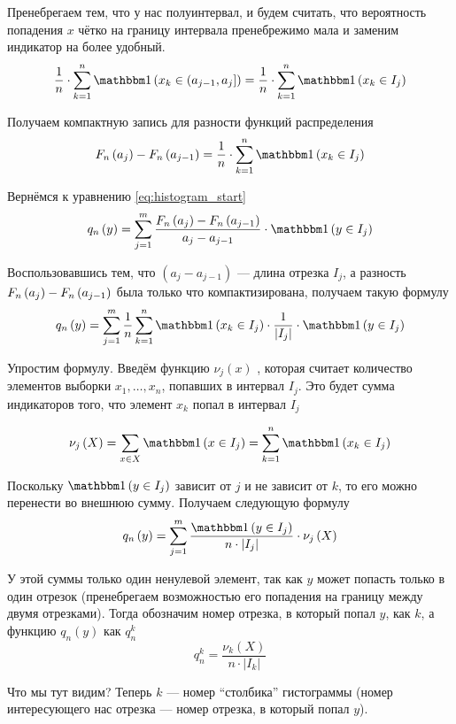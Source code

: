 Пренебрегаем тем, что у нас полуинтервал, и будем считать,
что вероятность попадения $x$ чётко на границу интервала пренебрежимо мала
и заменим индикатор на более удобный.
$$\frac{1}{n}\cdot \sum_{k=1}^n \indicator{x_k\in \left(a_{j-1},a_j\right]}
=\frac{1}{n}\cdot \sum_{k=1}^n \indicator{x_k\in I_j}$$

Получаем компактную запись для разности функций распределения
\begin{equation}\label{eq:cdfn_difference_final}
\cdfn{a_j}-\cdfn{a_{j-1}}
=\frac{1}{n}\cdot \sum_{k=1}^n \indicator{x_k\in I_j}
\end{equation}


Вернёмся к уравнению \eqref{eq:histogram_start}
$$
q_n\left(y\right)
=\sum_{j=1}^m \frac{\cdfn{a_j}-\cdfn{a_{j-1}}}{a_j-a_{j-1}}
    \cdot\indicator{y\in I_j}
    $$

Воспользовавшись тем, что $\left(a_j-a_{j-1}\right)$ --- длина отрезка $I_j$,
а разность $F_n\left(a_j\right)-F_n\left(a_{j-1}\right)$ была только что компактизирована,
получаем такую формулу
$$q_n\left(y\right)=\sum_{j=1}^m\frac{1}{n}\sum_{k=1}^n
\indicator{x_k\in I_j}\cdot\frac{1}{\left|I_j\right|}
\cdot\indicator{y \in I_j}$$

Упростим формулу.
Введём функцию $\nu_j\left(x\right)$ \cite[стр.~68]{BorovkovMS},
которая считает количество элементов выборки $x_1, \dots, x_n$,
попавших в интервал $I_j$.
Это будет сумма индикаторов того, что элемент $x_k$ попал в интервал $I_j$

$$\nu_j\left(X\right)
=\sum_{x\in X} \indicator{x\in I_j}
=\sum_{k=1}^n \indicator{x_k\in I_j}$$

Поскольку $\indicator{y\in I_j}$ зависит от $j$ и не зависит от $k$,
то его можно перенести во внешнюю сумму. Получаем следующую формулу
$$q_n\left(y\right)
=\sum_{j=1}^m \frac{\indicator{y\in I_j}}{n\cdot\left|I_j\right|}
    \cdot\nu_j\left(X\right)$$

У этой суммы только один ненулевой элемент,
так как $y$ может попасть только в один отрезок
(пренебрегаем возможностью его попадения на границу между двумя отрезками).
Тогда обозначим номер отрезка, в который попал $y$, как $k$,
а функцию $q_n\left(y\right)$ как $q_n^k$
\begin{equation}\label{eq:histogram_borovkov}
q_n^k=
    \frac{\nu_k\left(X\right)}{n\cdot\left|I_k\right|}
\end{equation}


Что мы тут видим? Теперь $k$ --- номер ``столбика'' гистограммы
(номер интересующего нас отрезка --- номер отрезка, в который попал $y$).

